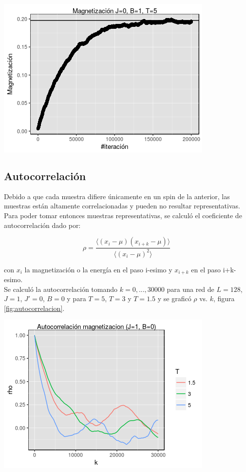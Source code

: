 \documentclass[%
 reprint,
 amsmath,amssymb,
 aps,
spanish]{revtex4-1}
\begin{document}
\begin{minipage}{0.45\textwidth}									
\centering
\includegraphics[totalheight=0.25\textheight]{imagenes/termalizacion/magnetizacion.png}
\label{termalizacion}
\end{minipage}

\subsection{Autocorrelación}
Debido a que cada muestra difiere únicamente en un spin de la anterior, las muestras están altamente correlacionadas y pueden no resultar representativas. Para poder tomar entonces muestras representativas, se calculó el coeficiente de autocorrelación dado por:

\begin{equation}
\rho = \frac{\langle(x_i-\mu)(x_{i+k}-\mu)\rangle}{\langle(x_i-\mu)^2\rangle}
\label{ec:autocorrelacion}
\end{equation}

con $x_i$ la magnetización o la energía en el paso i-esimo y $x_{i+k}$ en el paso i+k-esimo.\\
Se calculó la autocorrelación tomando $k=0,...,30000$ para una red de $L=128$, $J=1$, $J'=0$, $B=0$ y para $T=5$, $T=3$ y $T=1.5$ y se graficó $\rho$ vs. $k$, figura \ref{fig:autocorrelacion}.

\begin{minipage}{0.45\textwidth}									
\centering
\includegraphics[totalheight=0.25\textheight]{imagenes/autocorrelacion/energia.png}
\label{fig:autocorrelacion}
\end{minipage}
\end{document}

